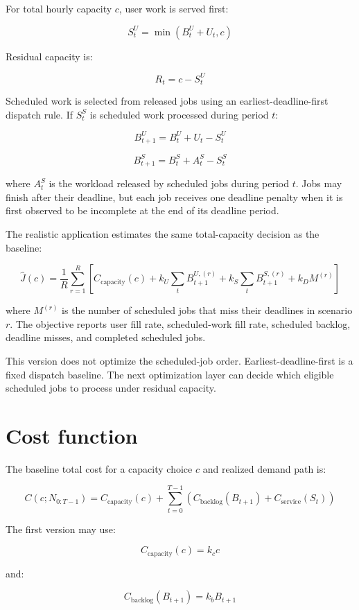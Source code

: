 \documentclass[11pt,a4paper]{article}
\newcommand{\equationnote}[1]{\begin{center}\colorbox{boxblue}{\parbox{0.92\linewidth}{\begin{equation*}#1\end{equation*}}}\end{center}}
\begin{document}
For total hourly capacity $c$, user work is served first:

\equationnote{S^U_t = \min(B^U_t + U_t, c)}

Residual capacity is:

\equationnote{R_t = c - S^U_t}

Scheduled work is selected from released jobs using an earliest-deadline-first
dispatch rule. If $S^S_t$ is scheduled work processed during period $t$:

\equationnote{B^U_{t+1} = B^U_t + U_t - S^U_t}

\equationnote{B^S_{t+1} = B^S_t + A^S_t - S^S_t}

where $A^S_t$ is the workload released by scheduled jobs during period $t$.
Jobs may finish after their deadline, but each job receives one deadline
penalty when it is first observed to be incomplete at the end of its deadline
period.

The realistic application estimates the same total-capacity decision as the
baseline:

\equationnote{\widehat{J}(c) = \frac{1}{R}\sum_{r=1}^{R}\left[C_{\text{capacity}}(c) + k_U \sum_t B^{U,(r)}_{t+1} + k_S \sum_t B^{S,(r)}_{t+1} + k_D M^{(r)}\right]}

where $M^{(r)}$ is the number of scheduled jobs that miss their deadlines in
scenario $r$. The objective reports user fill rate, scheduled-work fill rate,
scheduled backlog, deadline misses, and completed scheduled jobs.

This version does not optimize the scheduled-job order. Earliest-deadline-first
is a fixed dispatch baseline. The next optimization layer can decide which
eligible scheduled jobs to process under residual capacity.

\section{Cost function}

The baseline total cost for a capacity choice $c$ and realized demand path is:

\equationnote{C(c;N_{0:T-1}) = C_{\text{capacity}}(c) + \sum_{t=0}^{T-1} \left(C_{\text{backlog}}(B_{t+1}) + C_{\text{service}}(S_t)\right)}

The first version may use:

\equationnote{C_{\text{capacity}}(c) = k_c c}

and:

\equationnote{C_{\text{backlog}}(B_{t+1}) = k_b B_{t+1}}
\end{document}
